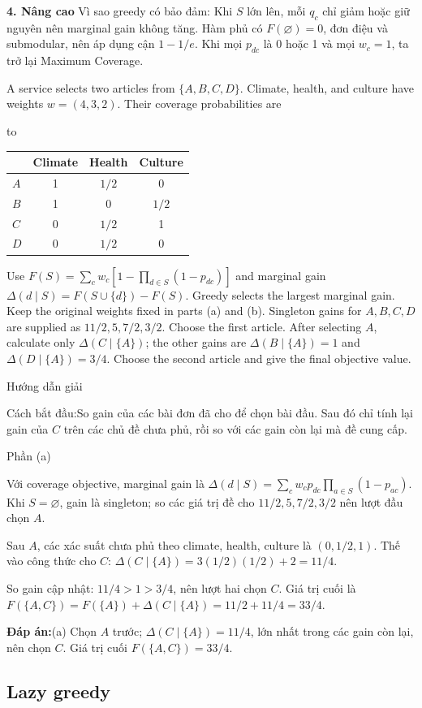 \documentclass[10pt,a4paper,twocolumn]{article}
\makeatletter
\newcommand{\maptag}[1]{\phantomsection\@bsphack\protected@write\@auxout{}{\string\newlabel{#1}{{}{\thepage}{}{\@currentHref}{}}}\@esphack}
\newif\ifexamheadingprinted
\newcommand{\topic}[2]{%
  \global\examheadingprintedfalse\par\subsection{#2}\label{topic:#1}}
\newcommand{\key}[1]{#1:\enspace}
\newcommand{\solutionprompt}[1]{\par\addvspace{1pt}\noindent\key{Cách bắt đầu}#1\par\addvspace{2pt}}
\newcommand{\blocklabel}[1]{\par\noindent#1\par\nobreak}
\newcommand{\answer}[1]{%
  \par\addvspace{3pt}%
  \blocklabel{#1Hướng dẫn giải}}
\newcommand{\finalanswer}[1]{%
  \par\addvspace{3pt}\noindent\textbf{Đáp án:}\nobreak\enspace#1\par}
\newcommand{\guidepart}[1]{%
  \par\addvspace{1.5pt}%
  \blocklabel{Phần #1}}
\newenvironment{examtable}[1]{%
  \par\addvspace{2pt}\noindent\hbox to \linewidth\bgroup\hfil
  \setlength{\tabcolsep}{4pt}%
  \renewcommand{\arraystretch}{1.12}\begin{tabular}{#1}%
}{\end{tabular}\hfil\egroup\par\addvspace{2pt}}
\newcommand{\unitheading}[2]{%
  \par\addvspace{1pt}\noindent\textbf{#1. #2}\enspace}
\newcommand{\unitadvanced}{\unitheading{4}{Nâng cao}}
\makeatother
\begin{document}
\unitadvanced
\key{Vì sao greedy có bảo đảm} Khi $S$ lớn lên, mỗi $q_c$ chỉ giảm hoặc giữ nguyên nên marginal gain không tăng. Hàm phủ có $F(\varnothing)=0$, đơn điệu và submodular, nên áp dụng cận $1-1/e$. Khi mọi $p_{dc}$ là 0 hoặc 1 và mọi $w_c=1$, ta trở lại Maximum Coverage.

A service selects two articles from $\{A,B,C,D\}$. Climate, health, and culture have weights $w=(4,3,2)$. Their coverage probabilities are
\begin{examtable}{@{}lccc@{}}
\toprule
& Climate & Health & Culture\\
\midrule
$A$ & 1 & $1/2$ & 0\\
$B$ & 1 & 0 & $1/2$\\
$C$ & 0 & $1/2$ & 1\\
$D$ & 0 & $1/2$ & 0\\
\bottomrule
\end{examtable}
Use $F(S)=\sum_c w_c[1-\prod_{d\in S}(1-p_{dc})]$ and marginal gain $\Delta(d\mid S)=F(S\cup\{d\})-F(S)$. Greedy selects the largest marginal gain. Keep the original weights fixed in parts (a) and (b).
 Singleton gains for $A,B,C,D$ are supplied as $11/2,5,7/2,3/2$. Choose the first article. After selecting $A$, calculate only $\Delta(C\mid\{A\})$; the other gains are $\Delta(B\mid\{A\})=1$ and $\Delta(D\mid\{A\})=3/4$. Choose the second article and give the final objective value.

\answer{\maptag{answer:Pr30}}
\solutionprompt{So gain của các bài đơn đã cho để chọn bài đầu. Sau đó chỉ tính lại gain của $C$ trên các chủ đề chưa phủ, rồi so với các gain còn lại mà đề cung cấp.}
\guidepart{(a)}
\begin{guidesteps}
\item Với coverage objective, marginal gain là $\Delta(d\mid S)=\sum_cw_cp_{dc}\prod_{a\in S}(1-p_{ac})$. Khi $S=\varnothing$, gain là singleton; so các giá trị đề cho $11/2,5,7/2,3/2$ nên lượt đầu chọn $A$.
\item Sau $A$, các xác suất chưa phủ theo climate, health, culture là $(0,1/2,1)$. Thế vào công thức cho $C$: $\Delta(C\mid\{A\})=3(1/2)(1/2)+2=11/4$.
\item So gain cập nhật: $11/4>1>3/4$, nên lượt hai chọn $C$. Giá trị cuối là $F(\{A,C\})=F(\{A\})+\Delta(C\mid\{A\})=11/2+11/4=33/4$.
\end{guidesteps}
\finalanswer{(a) Chọn $A$ trước; $\Delta(C\mid\{A\})=11/4$, lớn nhất trong các gain còn lại, nên chọn $C$. Giá trị cuối $F(\{A,C\})=33/4$.}
\topic{lazy}{Lazy greedy}
\end{document}
